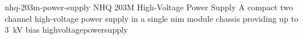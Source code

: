 \newglsXequipment%
{nhq-203m-power-supply}%
{NHQ 203M High{\--}Voltage Power Supply}%
{A compact two channel \gls{high-voltage} power supply in a single \gls{nim} module chassis providing up to \SI{3}{\kilo\volt} bias}%
{highvoltagepowersupply}%
